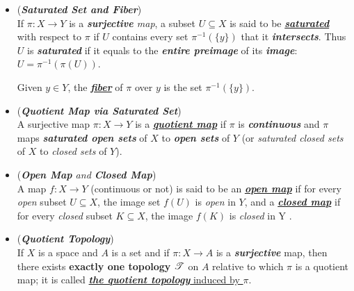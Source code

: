\documentclass[11pt]{article}
\begin{document}
\begin{itemize}
\item \begin{definition} (\emph{\textbf{Saturated Set and Fiber}})\\
If $\pi: X \rightarrow Y$ is a \emph{\textbf{surjective} map}, a subset $U \subseteq X$ is said to be \underline{\emph{\textbf{saturated}}} with respect to $\pi$ if $U$ contains every set $\pi^{-1}(\{y\})$ that it \emph{\textbf{intersects}}. Thus $U$ is \emph{\textbf{saturated}} if it equals to the \textbf{\emph{entire preimage}} of its \emph{\textbf{image}}: $U =\pi^{-1}(\pi(U))$. 

Given $y \in Y$, the \underline{\emph{\textbf{fiber}}} of $\pi$ over $y$ is the set $\pi^{-1}(\{y\})$. 
\end{definition}

\item \begin{definition} (\emph{\textbf{Quotient Map via Saturated Set}})\\
A surjective map $\pi : X \rightarrow Y$ is a \underline{\emph{\textbf{quotient map}}} if $\pi$ is \emph{\textbf{continuous}} and $\pi$ maps \emph{\textbf{saturated open sets}} of $X$ to \emph{\textbf{open sets}} of $Y$ (or \emph{saturated closed sets} of $X$ to \emph{closed sets} of $Y$).
\end{definition}


\item \begin{definition} (\emph{\textbf{Open Map} and \textbf{Closed Map}})\\
A map $f: X \rightarrow Y$ (continuous or not) is said to be an \underline{\emph{\textbf{open map}}} if for every \emph{open} subset $U \subseteq X$, the image set $f(U)$ is \emph{open} in $Y$, and a  \underline{\emph{\textbf{closed map}}} if for every \emph{closed} subset $K \subseteq X$, the image $f(K)$ is \emph{closed} in Y . 
\end{definition}


\item \begin{definition} (\emph{\textbf{Quotient Topology}})\\
If $X$ is a space and $A$ is a set and if $\pi: X \rightarrow A$ is a \textbf{\emph{surjective}} map, then there exists \textbf{exactly one topology} ${\mathscr T}$ on $A$ relative to which $\pi$ is a quotient map; it is called \underline{\emph{\textbf{the quotient topology}} induced by $\pi$}.
\end{definition}


\end{itemize}
\end{document}
